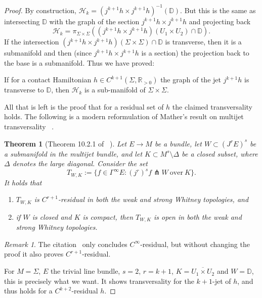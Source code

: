 \documentclass{amsart}
\newcommand{\Hcal}{{\mathcal{H}}}
\newcommand{\DD}{\mathbb{D}}
\newcommand{\RR}{\mathbb{R}}
\newtheorem{theorem}{Theorem}
\theoremstyle{definition}
\theoremstyle{remark}
\newtheorem{remark}[proposition]{Remark}
\numberwithin{equation}{section}
\begin{document}
\begin{proof}
By construction, $\Hcal_k=(j^{k+1}h\times j^{k+1}h)^{-1}(\DD)$. But this is the same as intersecting $\DD$ with the graph of the section $j^{k+1}h\times j^{k+1}h$ and projecting back
$$\Hcal_k = \pi_{\Sigma\times\Sigma}((j^{k+1}h\times j^{k+1}h)(U_1\times U_2)\cap \DD).$$
If the intersection $(j^{k+1}h\times j^{k+1}h)(\Sigma\times\Sigma)\cap \DD$ is transverse, then it is a submanifold and then (since $j^{k+1}h\times j^{k+1}h$ is a section) the projection back to the base is a submanifold. Thus we have proved:
\begin{center}
    If for a contact Hamiltonian $h\in C^{k+1}(\Sigma,\RR_{>0})$ the graph of the jet $j^{k+1}h$ is transverse to $\DD$, then $\Hcal_k$ is a sub-manifold of $\Sigma\times\Sigma$. 
\end{center}
All that is left is the proof that for a residual set of $h$ the claimed transversality holds. The following is a modern reformulation of Mather's result on multijet transversality ~\cite{M70}.
\begin{theorem}[Theorem 10.2.1 of ~\cite{G25}]
    Let $E\to M$ be a bundle, let $W\subset (J^{r}E)^s$ be a submanifold in the multijet bundle, and let $K\subset M^{s}\setminus\Delta$ be a closed subset, where $\Delta$ denotes the large diagonal. Consider the set
    $$T_{W,K}:=\{f\in \Gamma^{\infty}E:(j^r)^sf\pitchfork W \mathrm{\:over\:}K\}.$$
    It holds that
    \begin{enumerate}
        \item $T_{W,K}$ is $C^{r+1}$-residual in both the weak and strong Whitney topologies, and
        \item if $W$ is closed and $K$ is compact, then $T_{W,K}$ is open in both the weak and strong Whitney topologies.
    \end{enumerate}
\end{theorem}

\begin{remark}
    The citation~\cite{G25} only concludes $C^{\infty}$-residual, but without changing the proof it also proves $C^{r+1}$-residual.
\end{remark}

For $M=\Sigma$, $E$ the trivial line bundle, $s=2$,  $r=k+1$, $K=\overline{U_1\times U_2}$ and $W=\DD$, this is precisely what we want. It shows transversality for the $k+1$-jet of $h$, and thus holds for a $C^{k+2}$-residual $h$. 


\end{proof}
\end{document}
